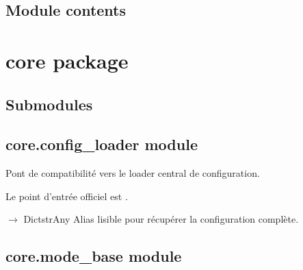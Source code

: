 \documentclass[letterpaper,10pt,french]{sphinxmanual}
\begin{document}
\subsection{Module contents}
\label{\detokenize{api/config:module-config}}\label{\detokenize{api/config:module-contents}}
\sphinxstepscope


\section{core package}
\label{\detokenize{api/core:core-package}}\label{\detokenize{api/core::doc}}

\subsection{Submodules}
\label{\detokenize{api/core:submodules}}

\subsection{core.config\_loader module}
\label{\detokenize{api/core:module-core.config_loader}}\label{\detokenize{api/core:core-config-loader-module}}
\sphinxAtStartPar
Pont de compatibilité vers le loader central de configuration.

\sphinxAtStartPar
Le point d’entrée officiel est .

\begin{fulllineitems}
\label{\detokenize{api/core:core.config_loader.get_config}}
\pysigstartsignatures
\pysiglinewithargsret
{}
{}
{{ $\rightarrow$ Dict\DUrole{p}{{[}}strAny\DUrole{p}{{]}}}}
\pysigstopsignatures
\sphinxAtStartPar
Alias lisible pour récupérer la configuration complète.

\end{fulllineitems}



\subsection{core.mode\_base module}
\label{\detokenize{api/core:module-core.mode_base}}\label{\detokenize{api/core:core-mode-base-module}}
\end{document}
